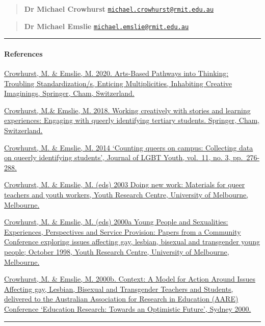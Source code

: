 \documentclass[
]{article}
\begin{document}
\begin{quote}
\textbf{Dr Michael Crowhurst}
\href{mailto:michael.crowhurst@rmit.edu.au}{\nolinkurl{michael.crowhurst@rmit.edu.au}}
\end{quote}

\begin{quote}
\textbf{Dr Michael Emslie}
\href{mailto:michael.emslie@rmit.edu.au}{\nolinkurl{michael.emslie@rmit.edu.au}}
\end{quote}

\begin{center}\rule{0.5\linewidth}{0.5pt}\end{center}

\hypertarget{references}{%
\paragraph{\texorpdfstring{References
}{References  }}\label{references}}

\href{https://www.springer.com/gp/book/9783030375065}{Crowhurst, M. \&
Emslie, M. 2020. Arts-Based Pathways into Thinking: Troubling
Standardization/s, Enticing Multiplicities, Inhabiting Creative
Imaginings, Springer, Cham, Switzerland.}

\href{https://www.palgrave.com/gp/book/9783319697536}{Crowhurst, M.\&
Emslie, M. 2018. Working creatively with stories and learning
experiences: Engaging with queerly identifying tertiary students.
Springer, Cham, Switzerland.}

\href{https://www.tandfonline.com/doi/abs/10.1080/19361653.2013.879466}{Crowhurst,
M. \& Emslie, M. 2014 `Counting queers on campus: Collecting data on
queerly identifying students', Journal of LGBT Youth, vol.~11, no. 3,
pp.~276-288.}

\href{https://www.researchgate.net/publication/262451596_Doing_new_work_Materials_for_queer_teachers_and_youth_workers}{Crowhurst,
M. \& Emslie, M. (eds) 2003 Doing new work: Materials for queer teachers
and youth workers, Youth Research Centre, University of Melbourne,
Melbourne.}

\href{https://www.researchgate.net/publication/262451598_Young_People_and_Sexualities_Experiences_Perspectives_and_Service_Provision_Papers_from_a_Community_Conference_exploring_issues_affecting_gay_lesbian_bisexual_and_transgender_young_people_October_1998}{Crowhurst,
M. \& Emslie, M. (eds) 2000a Young People and Sexualities: Experiences,
Perspectives and Service Provision: Papers from a Community Conference
exploring issues affecting gay, lesbian, bisexual and transgender young
people; October 1998, Youth Research Centre, University of Melbourne,
Melbourne.}

\href{https://www.researchgate.net/publication/317099886_Context_A_Model_for_Action_Around_Issues_Affecting_gay_Lesbian_Bisexual_and_Transgender_Teachers_and_Student}{Crowhurst,
M. \& Emslie, M. 2000b. Context: A Model for Action Around Issues
Affecting gay, Lesbian, Bisexual and Transgender Teachers and Students,
delivered to the Australian Association for Research in Education (AARE)
Conference `Education Research: Towards an Optimistic Future', Sydney
2000.}

\begin{center}\rule{0.5\linewidth}{0.5pt}\end{center}
\end{document}
